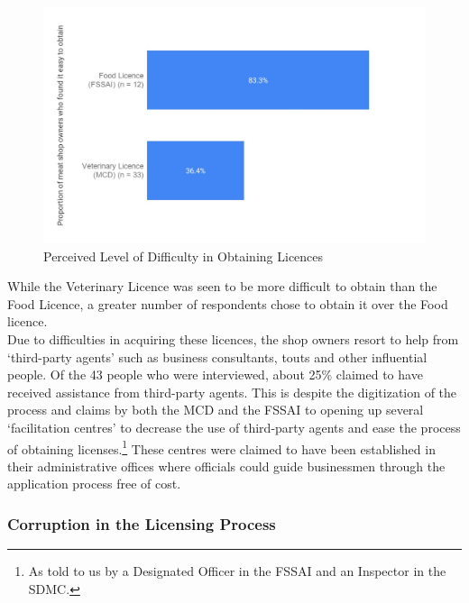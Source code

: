 \documentclass[a4paper, 12pt]{article}
\begin{document}
\begin{figure}[H]
\centering
\includegraphics[width=5.5in]{Fig 4.jpg}
\caption[Perceived Level of Difficulty in Obtaining Licences] {Perceived Level of Difficulty in Obtaining Licences \protect\footnotemark}
\end{figure} 


While the Veterinary Licence was seen to be more difficult to obtain than the Food Licence, a greater number of respondents chose to obtain it over the Food licence. \\

Due to difficulties in acquiring these licences, the shop owners resort to help from ‘third-party agents’ such as business consultants, touts and other influential people. Of the 43 people who were interviewed, about 25\% claimed to have received assistance from third-party agents. This is despite the digitization of the process and claims by both the MCD and the FSSAI to opening up several ‘facilitation centres’ to decrease the use of third-party agents and ease the process of obtaining licenses.\footnote{ As told to us by a Designated Officer in the FSSAI and an Inspector in the SDMC.} These centres were claimed to have been established in their administrative offices where officials could guide businessmen through the application process free of cost. \\

\subsubsection{Corruption in the Licensing Process}
\end{document}
